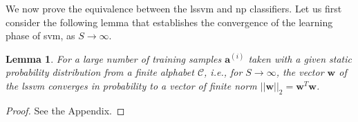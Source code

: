 \documentclass[draftcls,onecolumn,12pt]{IEEEtran}
\newtheorem{lemma}{Lemma}
\begin{document}
We now prove the equivalence between the \ac{lssvm} and \ac{np} classifiers. Let us first consider the following lemma that establishes the convergence of the learning phase of \ac{svm}, as $S\rightarrow \infty$.

\begin{lemma}
	\label{lem:lem1}
	For a large number of training samples $\bm{a}^{(i)}$ taken with a given static probability distribution from a finite alphabet $\mathcal C$, i.e., for $S \rightarrow \infty$, the vector $\bm{w}$ of the \ac{lssvm} converges in probability to a vector of finite norm $||\bm{w}||_2 = \bm{w}^T\bm{w}$.
\end{lemma}

\begin{proof}
See the Appendix.
\end{proof}
 
\end{document}
